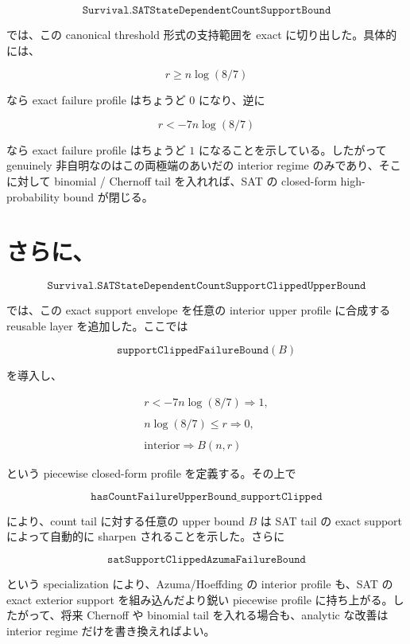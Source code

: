 \documentclass[12pt,a4paper]{article}
\begin{document}
\[
\texttt{Survival.SATStateDependentCountSupportBound}
\]

では、この canonical threshold 形式の支持範囲を exact に切り出した。具体的には、

\[
r \ge n\log(8/7)
\]

なら exact failure profile はちょうど \(0\) になり、逆に

\[
r < -7n\log(8/7)
\]

なら exact failure profile はちょうど \(1\) になることを示している。したがって genuinely 非自明なのはこの両極端のあいだの interior regime のみであり、そこに対して binomial / Chernoff tail を入れれば、SAT の closed-form high-probability bound が閉じる。

\section{さらに、}\label{ux3055ux3089ux306b-25}

\[
\texttt{Survival.SATStateDependentCountSupportClippedUpperBound}
\]

では、この exact support envelope を任意の interior upper profile に合成する reusable layer を追加した。ここでは

\[
\texttt{supportClippedFailureBound}(B)
\]

を導入し、

\[
\begin{aligned}
r < -7n\log(8/7) \Rightarrow 1, \\
\qquad \\
n\log(8/7) \le r \Rightarrow 0, \\
\qquad \\
\text{interior} \Rightarrow B(n,r)
\end{aligned}
\]

という piecewise closed-form profile を定義する。その上で

\[
\texttt{hasCountFailureUpperBound\_supportClipped}
\]

により、count tail に対する任意の upper bound \(B\) は SAT tail の exact support によって自動的に sharpen されることを示した。さらに

\[
\texttt{satSupportClippedAzumaFailureBound}
\]

という specialization により、Azuma/Hoeffding の interior profile も、SAT の exact exterior support を組み込んだより鋭い piecewise profile に持ち上がる。したがって、将来 Chernoff や binomial tail を入れる場合も、analytic な改善は interior regime だけを書き換えればよい。
\end{document}
